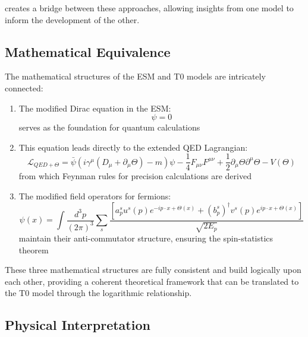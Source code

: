 \documentclass[12pt,a4paper]{article}
\begin{document}
	creates a bridge between these approaches, allowing insights from one model to inform the development of the other.
	
	\subsection{Mathematical Equivalence}
	\label{subsec:math_equivalence}
	
	The mathematical structures of the ESM and T0 models are intricately connected:
	
	\begin{enumerate}
		\item The modified Dirac equation in the ESM:
		\begin{equation}
			[i\gamma^{\mu}(\partial_{\mu} + \partial_{\mu}\Theta) - m]\psi = 0
			\label{eq:esm_dirac_recap}
		\end{equation}
		serves as the foundation for quantum calculations
		
		\item This equation leads directly to the extended QED Lagrangian:
		\begin{equation}
			\mathcal{L}_{QED+\Theta} = \bar{\psi}(i\gamma^{\mu}(D_{\mu} + \partial_{\mu}\Theta) - m)\psi - \frac{1}{4}F_{\mu\nu}F^{\mu\nu} + \frac{1}{2}\partial_{\mu}\Theta\partial^{\mu}\Theta - V(\Theta)
			\label{eq:qed_theta_recap}
		\end{equation}
		from which Feynman rules for precision calculations are derived
		
		\item The modified field operators for fermions:
		\begin{equation}
			\psi(x) = \int\frac{d^3p}{(2\pi)^3} \sum_s \frac{[a_p^s u^s(p)e^{-ip\cdot x+\Theta(x)} + (b_p^s)^{\dagger}v^s(p)e^{ip\cdot x+\Theta(x)}]}{\sqrt{2E_p}}
			\label{eq:field_operator_recap}
		\end{equation}
		maintain their anti-commutator structure, ensuring the spin-statistics theorem
	\end{enumerate}
	
	These three mathematical structures are fully consistent and build logically upon each other, providing a coherent theoretical framework that can be translated to the T0 model through the logarithmic relationship.
	
	\subsection{Physical Interpretation}
	\label{subsec:physical_interpretation}
	
\end{document}
